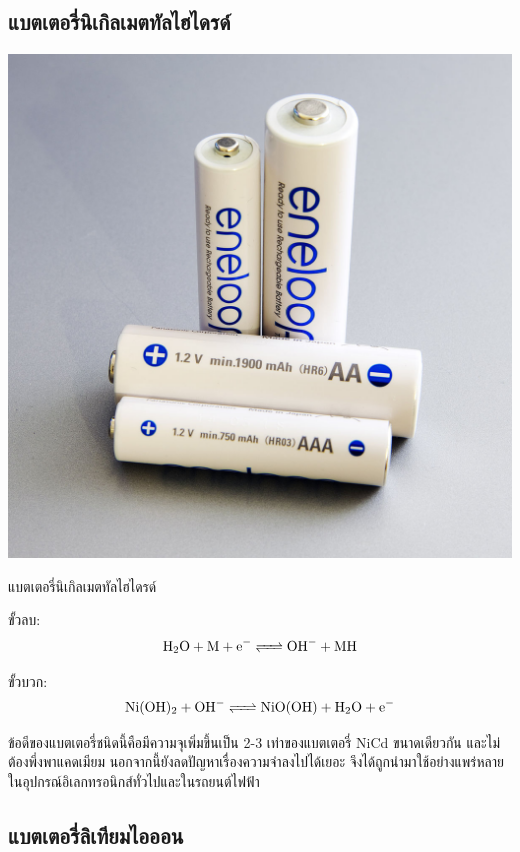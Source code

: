 \documentclass[a4paper,nobib,openany,10pt]{tufte-book}
\begin{document}
\subsection{แบตเตอรี่นิเกิลเมตทัลไฮไดรด์}
\label{sec:orgd1cfb70}

\begin{marginfigure}
  \centering
  \includegraphics[width=\textwidth]{pictures/nimh-battery}
\caption{แบตเตอรี่นิเกิลเมตทัลไฮไดรด์}
\end{marginfigure}

ขั้วลบ:
$$ \ce{H2O + M + e^- <=> OH^- + MH} $$

ขั้วบวก:
$$ \ce{Ni(OH)2 + OH^- <=> NiO(OH) + H2O + e^-} $$

ข้อดีของแบตเตอรี่ชนิดนี้คือมีความจุเพิ่มขึ้นเป็น 2-3 เท่าของแบตเตอรี่ NiCd ขนาดเดียวกัน และไม่ต้องพึ่งพาแคดเมียม นอกจากนี้ยังลดปัญหาเรื่องความจำลงไปได้เยอะ จึงได้ถูกนำมาใช้อย่างแพร่หลายในอุปกรณ์อิเลกทรอนิกส์ทั่วไปและในรถยนต์ไฟฟ้า

\subsection{แบตเตอรี่ลิเทียมไอออน}
\label{sec:org50c59f5}
\end{document}

